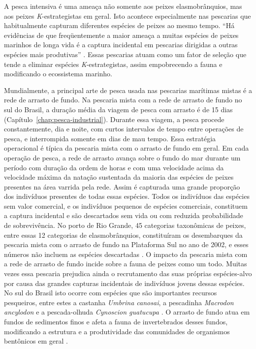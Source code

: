 \documentclass[a4paper,11pt,twoside,showtrims,onecolumn,openright,final]{memoir}
\begin{document}
A pesca intensiva é uma ameaça não somente aos peixes elasmobrânquios, mas aos peixes \emph{K}-estrategistas 
em geral. Isto acontece especialmente nas pescarias que habitualmente capturam diferentes espécies de 
peixes ao mesmo tempo. ``Há evidências de que freqüentemente a maior ameaça a muitas espécies de peixes 
marinhos de longa vida é a captura incidental em pescarias dirigidas a outras espécies 
mais produtivas'' \citep[p. 6, tradução dos autores]{musick2000a}. %
Essas pescarias atuam como um fator de seleção que tende a eliminar espécies \emph{K}-estrategistas, 
assim empobrecendo a fauna e modificando o ecossistema marinho.

Mundialmente, a principal arte de pesca usada nas pescarias marítimas mistas é a rede de arrasto 
de fundo. Na pescaria mista com a rede de arrasto de fundo no sul do Brasil, a duração média da viagem 
de pesca com arrasto é de 15 dias (Capítulo~\ref{chap:pesca-industrial}). 
Durante essa viagem, a pesca procede constantemente, dia e noite, com curtos intervalos de tempo entre 
operações de pesca, e interrompida somente em dias de mau tempo. Essa estratégia operacional é típica 
da pescaria mista com o arrasto de fundo em geral. Em cada operação de pesca, a rede de arrasto avança 
sobre o fundo do mar durante um período com duração da ordem de horas e com uma velocidade acima da 
velocidade máxima da natação sustentada da maioria das espécies de peixes presentes  na área varrida 
pela rede. Assim é capturada uma grande proporção dos indivíduos presentes de todas essas espécies. 
Todos os indivíduos das espécies sem valor comercial, e os indivíduos pequenos de espécies comerciais, 
constituem a captura incidental e são descartados sem vida ou com reduzida probabilidade de sobrevivência. 
No porto de Rio Grande, 45 categorias taxonômicas de peixes, entre essas 12 categorias de elasmobrânquios,  
constituíram os desembarques da pescaria mista com o arrasto de fundo na Plataforma Sul no ano de 2002, 
e esses números não incluem as espécies descartadas \citep{ceperg2003}. %
O impacto da pescaria mista com a rede de arrasto de fundo incide sobre a fauna de peixes como um todo. 
Muitas vezes essa pescaria prejudica ainda o recrutamento das suas próprias espécies-alvo por causa das 
grandes capturas incidentais de indivíduos jovens dessas espécies. No sul do Brasil isto ocorre com 
espécies que são importantes recursos pesqueiros, entre estes a  
castanha \emph{Umbrina canosai}, a pescadinha \emph{Macrodon ancylodon} 
e a pescada-olhuda \emph{Cynoscion guatucupa} \citep{vooren1983}. %
O arrasto de fundo atua em fundos de sedimentos finos e afeta a fauna de invertebrados desses fundos, 
modificando a estrutura e a produtividade das comunidades de organismos 
bentônicos em geral  \citep{dulvy2003}. %
\end{document}
